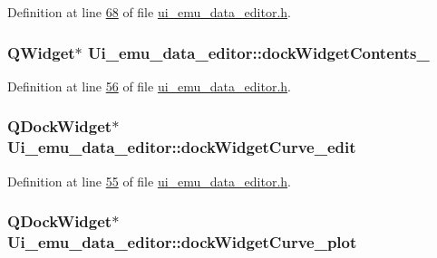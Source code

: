 Definition at line \hyperlink{a00138_source_l00068}{68} of file \hyperlink{a00138_source}{ui\+\_\+emu\+\_\+data\+\_\+editor.\+h}.

\hypertarget{a00079_a20ad5110f0fb7b329d067d354f8c9409}{
\subsubsection[{dock\+Widget\+Contents\+\_\+4}]{\setlength{\rightskip}{0pt plus 5cm}Q\+Widget$\ast$ Ui\+\_\+emu\+\_\+data\+\_\+editor\+::dock\+Widget\+Contents\+\_}}\label{a00079_a20ad5110f0fb7b329d067d354f8c9409}


Definition at line \hyperlink{a00138_source_l00056}{56} of file \hyperlink{a00138_source}{ui\+\_\+emu\+\_\+data\+\_\+editor.\+h}.

\hypertarget{a00079_a83360bdd61e994537715aa7c38e4e5b6}{
\subsubsection[{dock\+Widget\+Curve\+\_\+edit}]{\setlength{\rightskip}{0pt plus 5cm}Q\+Dock\+Widget$\ast$ Ui\+\_\+emu\+\_\+data\+\_\+editor\+::dock\+Widget\+Curve\+\_\+edit}}\label{a00079_a83360bdd61e994537715aa7c38e4e5b6}


Definition at line \hyperlink{a00138_source_l00055}{55} of file \hyperlink{a00138_source}{ui\+\_\+emu\+\_\+data\+\_\+editor.\+h}.

\hypertarget{a00079_a0edc87fb115fede171c0da1f99000874}{
\subsubsection[{dock\+Widget\+Curve\+\_\+plot}]{\setlength{\rightskip}{0pt plus 5cm}Q\+Dock\+Widget$\ast$ Ui\+\_\+emu\+\_\+data\+\_\+editor\+::dock\+Widget\+Curve\+\_\+plot}}\label{a00079_a0edc87fb115fede171c0da1f99000874}


